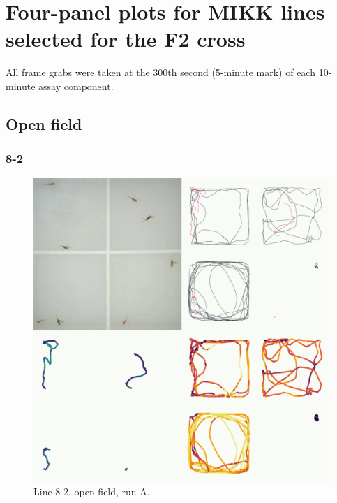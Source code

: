 \documentclass[
]{book}
\begin{document}
\hypertarget{four-panel-app}{%
\section{Four-panel plots for MIKK lines selected for the F2 cross}\label{four-panel-app}}

All frame grabs were taken at the 300th second (5-minute mark) of each 10-minute assay component.

\clearpage

\hypertarget{open-field-1}{%
\subsection{Open field}\label{open-field-1}}

\hypertarget{section}{%
\subsubsection{8-2}\label{section}}



\begin{figure}
\includegraphics[width=1\linewidth]{figs/mikk_behaviour/four_panel_plots/open_field_20191114_1040_8-2_L_A_300} \caption{Line 8-2, open field, run A.}\label{fig:4p-8-2-of-A}
\end{figure}
\end{document}
